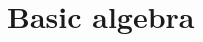 \documentclass[main.tex]{subfiles}
\begin{document}
\chapter{Basic algebra}
\label{ch:basic_algebra}
\end{document}

